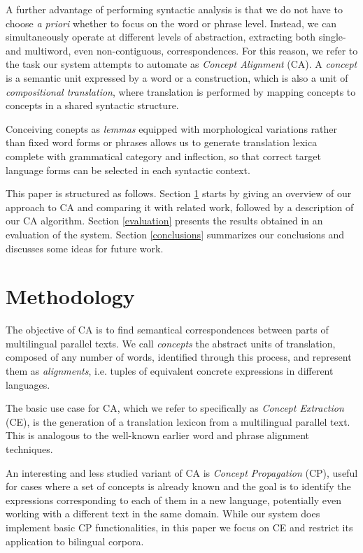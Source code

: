 \documentclass[11pt]{article}
\begin{document}
A further advantage of performing syntactic analysis is that we do not have to choose \textit{a priori} whether to focus on the word or phrase level. 
Instead, we can simultaneously operate at different levels of abstraction, extracting both single- and multiword, even non-contiguous, correspondences. 
For this reason, we refer to the task our system attempts to automate as \textit{Concept Alignment} (CA). 
A \textit{concept} is a semantic unit expressed by a word or a construction, which is also a unit of \textit{compositional translation}, where translation is performed by mapping concepts to concepts in a shared syntactic structure.

Conceiving conepts as \textit{lemmas} equipped with morphological variations rather than fixed word forms or phrases allows us to generate translation lexica complete with grammatical category and inflection, so that correct target language forms can be selected in each syntactic context.

This paper is structured as follows. 
Section \ref{methodology} starts by giving an overview of our approach to CA and comparing it with related work, followed by a description of our CA algorithm.
Section \ref{evaluation} presents the results obtained in an evaluation of the system.
Section \ref{conclusions} summarizes our conclusions and discusses some ideas for future work. 

\section{Methodology} \label{methodology}
The objective of CA is to find semantical correspondences between parts of multilingual parallel texts. 
We call \textit{concepts} the abstract units of translation, composed of any number of words, identified through this process, and represent them as \textit{alignments}, i.e. tuples of equivalent concrete expressions in different languages.

The basic use case for CA, which we refer to specifically as \textit{Concept Extraction} (CE), is the generation of a translation lexicon from a multilingual parallel text.
This is analogous to the well-known earlier word and phrase alignment techniques. 

An interesting and less studied variant of CA is \textit{Concept Propagation} (CP), useful for cases where a set of concepts is already known and the goal is to identify the expressions corresponding to each of them in a new language, potentially even working with a different text in the same domain.
While our system does implement basic CP functionalities, in this paper we focus on CE and restrict its application to bilingual corpora. 
\end{document}

